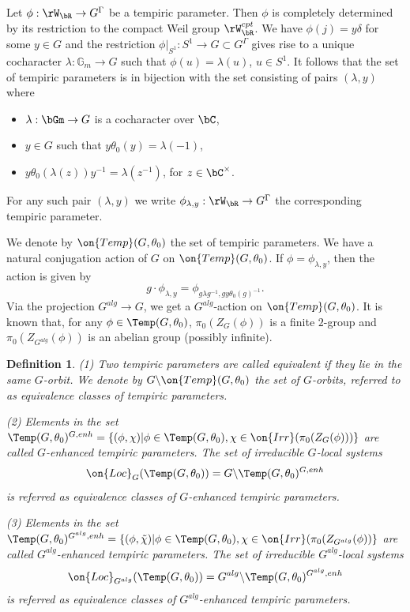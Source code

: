 \documentclass[12pt]{amsart}
\newtheorem{defe}[thm]{Definition}
\theoremstyle{remark}
\begin{document}
Let $\phi:\rW_\bR\to G^\Gamma$ be a tempiric parameter.
Then $\phi$ is completely determined by its restriction to the compact Weil group $\rW_\bR^{cpt}$.
We have $\phi(j)=y\delta$ for some $y\in G$ and the restriction $\phi|_{S^1}:S^1\to G\subset G^\Gamma$
gives rise to a unique cocharacter $\lambda:\mathbb G_m\to G$
such that $\phi(u)=\lambda(u)$, $u\in S^1$.
It follows  that 
the set of tempiric parameters is in bijection with the set consisting of pairs $(\lambda,y)$
where 


    \begin{itemize}
	\item [(i)] $\lambda:\bGm\rightarrow G$ is a cocharacter over $\bC$,
	\item [(ii)] $y\in G$ such that $y\theta_0(y)=\lambda(-1)$,
	\item [(iii)] $y\theta_0(\lambda(z)) y^{-1}=\lambda(z^{-1})$, for $z\in\bC^\times$.
    \end{itemize}
For any such pair $(\lambda,y)$ we write $\phi_{\lambda,y}:\rW_\bR\to  G^\Gamma$ the corresponding 
tempiric parameter.

We denote by $\on{Temp}(G,\theta_0)$ the set of tempiric parameters. 
We have a natural conjugation action of $G$ on $\on{Temp}(G,\theta_0)$. If $\phi=\phi_{\lambda,y}$, then the action is given by
 \[g\cdot\phi_{\lambda,y}=\phi_{g\lambda g^{-1},gy\theta_0(g)^{-1}}.\]
Via the projection $G^{alg}\to G$, we get 
a $G^{alg}$-action on $\on{Temp}(G,\theta_0)$.
It is known that, for any $\phi\in\Temp(G,\theta_0)$, $\pi_0(Z_G(\phi))$ is a finite $2$-group and 
 $\pi_0(Z_{G^{alg}}(\phi))$
 is an abelian group (possibly infinite). 


\begin{defe}\label{enh}
(1) 
Two tempiric parameters  are called equivalent if they lie in the same $G$-orbit.
We denote by $G\backslash\on{Temp}(G,\theta_0)$ the set of $G$-orbits, referred to as equivalence classes of tempiric parameters.

(2)  Elements in the set $\Temp(G,\theta_0)^{G,enh}=\{(\phi,\chi)|\phi\in\Temp(G,\theta_0), \chi\in\on{Irr}(\pi_0(Z_G(\phi)))\}$
are called $G$-enhanced tempiric parameters.
The set of irreducible $G$-local systems
\[\on{Loc}_G(\Temp(G,\theta_0))=G\backslash\Temp(G,\theta_0)^{G,enh}\]
is referred as equivalence classes of $G$-enhanced tempiric parameters.

(3)  Elements in the set $\Temp(G,\theta_0)^{G^{alg},enh}=\{(\phi,\tilde\chi)|\phi\in\Temp(G,\theta_0), \chi\in\on{Irr}(\pi_0(Z_{G^{alg}}(\phi))\}$
are called $G^{alg}$-enhanced tempiric parameters.
The set of irreducible $G^{alg}$-local systems
\[\on{Loc}_{G^{alg}}(\Temp(G,\theta_0))=G^{alg}\backslash\Temp(G,\theta_0)^{G^{alg},enh}\]
is referred as equivalence classes of $G^{alg}$-enhanced tempiric parameters.
    
\end{defe} 
\end{document}
